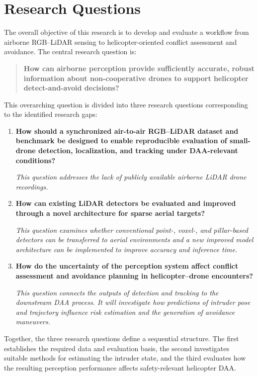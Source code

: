 \chapter{Research Questions}

The overall objective of this research is to develop and evaluate a workflow from airborne RGB--LiDAR sensing to helicopter-oriented conflict assessment and avoidance. The central research question is:

\begin{quote}
\textbf{How can airborne perception provide sufficiently accurate, robust information about non-cooperative drones to support helicopter detect-and-avoid decisions?}
\end{quote}

This overarching question is divided into three research questions corresponding to the identified research gaps:

\begin{enumerate}
    \item[\textbf{RQ1}] \textbf{How should a synchronized air-to-air RGB--LiDAR dataset and benchmark be designed to enable reproducible evaluation of small-drone detection, localization, and tracking under DAA-relevant conditions?}

    \textit{This question addresses the lack of publicly available airborne LiDAR drone recordings.}

    \item[\textbf{RQ2}] \textbf{How can existing LiDAR detectors be evaluated and improved through a novel architecture for sparse aerial targets?}

    \textit{This question examines whether conventional point-, voxel-, and pillar-based detectors can be transferred to aerial environments and a new improved model architecture can be implemented to improve accuracy and inference time.}

    \item[\textbf{RQ3}] \textbf{How do the uncertainty of the perception system affect conflict assessment and avoidance planning in helicopter--drone encounters?}

    \textit{This question connects the outputs of detection and tracking to the downstream DAA process. It will investigate how predictions of intruder pose and trajectory influence risk estimation and the generation of avoidance maneuvers.}
\end{enumerate}

Together, the three research questions define a sequential structure. The first establishes the required data and evaluation basis, the second investigates suitable methods for estimating the intruder state, and the third evaluates how the resulting perception performance affects safety-relevant helicopter DAA.

